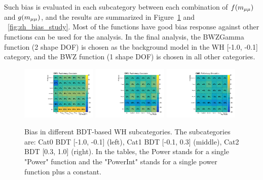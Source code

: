 Such bias is evaluated in each subcategory between each combination of $f(m_{\mu\mu})$ and $g(m_{\mu\mu})$, 
and the results are summarized in Figure~\ref{fig:wh_bias_study} and ~\ref{fig:zh_bias_study}.
Most of the functions have good bias response against other functions can be used for the analysis.
In the final analysis, the BWZGamma function (2 shape DOF) is chosen as the background model in the WH [-1.0, -0.1] category,
and the BWZ function (1 shape DOF) is chosen in all other categories. 


\begin{figure}[!htb]
  \centering
  \captionsetup{justification=justified}
  \includegraphics[width=0.32\textwidth]{pics/VH_sec/Bias_study/pulls_WH_BDT_n10_n01_signal_strength_1_table.pdf}
  \includegraphics[width=0.32\textwidth]{pics/VH_sec/Bias_study/pulls_WH_BDT_n01_p03_signal_strength_1_table.pdf}
  \includegraphics[width=0.32\textwidth]{pics/VH_sec/Bias_study/pulls_WH_BDT_p03_p10_signal_strength_1_table.pdf}
  \caption{Bias in different BDT-based WH subcategories. The subcategories are: Cat0 BDT [-1.0, -0.1] (left), Cat1 BDT [-0.1, 0.3] (middle), Cat2 BDT [0.3, 1.0] (right). In the tables, the Power stands for a single "Power" function and the "PowerInt" stands for a single power function plus a constant.}
  \label{fig:wh_bias_study}
\end{figure}

